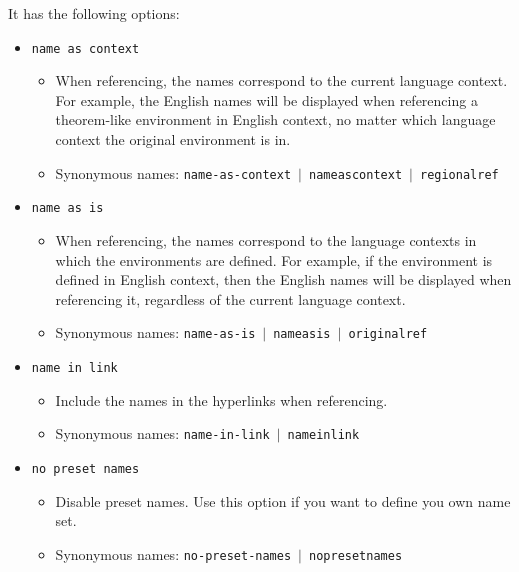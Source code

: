 \documentclass[classical]{einfart}
\newcommand{\packageoption}[1]{\texttt{\textcolor{code-option}{#1}}}
\begin{document}
\medskip
It has the following options:
\begin{itemize}[label=,leftmargin=1.25em,itemindent=-1.25em]
    \item \packageoption{name as context}
        \begin{itemize}
            \item When referencing, the names correspond to the current language context. For example, the English names will be displayed when referencing a theorem-like environment in English context, no matter which language context the original environment is in.
            \item Synonymous names: \packageoption{name-as-context} \,$|$\, \packageoption{nameascontext} \,$|$\, \packageoption{regionalref}
        \end{itemize}
    \item \packageoption{name as is}
        \begin{itemize}
            \item When referencing, the names correspond to the language contexts in which the environments are defined. For example, if the environment is defined in English context, then the English names will be displayed when referencing it, regardless of the current language context.
            \item Synonymous names: \packageoption{name-as-is} \,$|$\, \packageoption{nameasis} \,$|$\, \packageoption{originalref}
        \end{itemize}
    \item \packageoption{name in link}
        \begin{itemize}
            \item Include the names in the hyperlinks when referencing.
            \item Synonymous names: \packageoption{name-in-link} \,$|$\, \packageoption{nameinlink}
        \end{itemize}
    \item \packageoption{no preset names}
        \begin{itemize}
            \item Disable preset names. Use this option if you want to define you own name set.
            \item Synonymous names: \packageoption{no-preset-names} \,$|$\, \packageoption{nopresetnames}
        \end{itemize}
\end{itemize}
\end{document}
